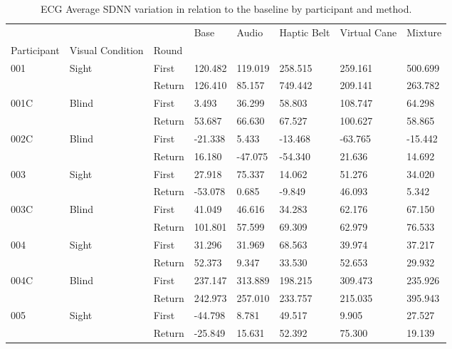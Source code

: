 
\begin{table}[!htb]
\centering
\caption{ECG Average SDNN variation in relation to the baseline by participant and method.}
\label{tab:ecg_sdnn_variation}
\begin{tabular}{llllllll}
\toprule
    &       &        &    Base &   Audio & Haptic Belt & Virtual Cane & Mixture \\
Participant & Visual Condition & Round &         &         &             &              &         \\
\midrule
001 & Sight & First & 120.482 & 119.019 &     258.515 &      259.161 & 500.699 \\
    &       & Return & 126.410 &  85.157 &     749.442 &      209.141 & 263.782 \\
001C & Blind & First &   3.493 &  36.299 &      58.803 &      108.747 &  64.298 \\
    &       & Return &  53.687 &  66.630 &      67.527 &      100.627 &  58.865 \\
002C & Blind & First & -21.338 &   5.433 &     -13.468 &      -63.765 & -15.442 \\
    &       & Return &  16.180 & -47.075 &     -54.340 &       21.636 &  14.692 \\
003 & Sight & First &  27.918 &  75.337 &      14.062 &       51.276 &  34.020 \\
    &       & Return & -53.078 &   0.685 &      -9.849 &       46.093 &   5.342 \\
003C & Blind & First &  41.049 &  46.616 &      34.283 &       62.176 &  67.150 \\
    &       & Return & 101.801 &  57.599 &      69.309 &       62.979 &  76.533 \\
004 & Sight & First &  31.296 &  31.969 &      68.563 &       39.974 &  37.217 \\
    &       & Return &  52.373 &   9.347 &      33.530 &       52.653 &  29.932 \\
004C & Blind & First & 237.147 & 313.889 &     198.215 &      309.473 & 235.926 \\
    &       & Return & 242.973 & 257.010 &     233.757 &      215.035 & 395.943 \\
005 & Sight & First & -44.798 &   8.781 &      49.517 &        9.905 &  27.527 \\
    &       & Return & -25.849 &  15.631 &      52.392 &       75.300 &  19.139 \\
\bottomrule
\end{tabular}
\end{table}

